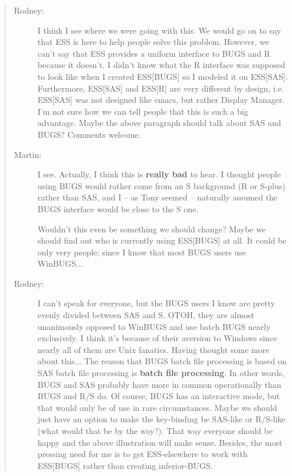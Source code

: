 \documentclass{article}
\newenvironment{Comment}{\begin{quote}\small\itshape }{\end{quote}}
\begin{document}
\begin{Comment}
\begin{description}
 \item[Rodney:]  I think I see where we were going with this.  We would go on to
say that ESS is here to help people solve this problem.  However,
we can't say that ESS provides a uniform interface to BUGS and R because
it doesn't.  I didn't know what the R interface was supposed to look like
when I created ESS[BUGS] so I modeled it on ESS[SAS].  Furthermore,
ESS[SAS] and ESS[R] are very different by design, i.e. ESS[SAS] was not
designed like emacs, but rather Display Manager.  I'm not sure how we can tell
people that this is such a big advantage.  Maybe the above paragraph
should talk about SAS and BUGS?  Comments welcome.

\item[Martin:] I see. Actually, I think this is \textbf{really bad} to hear.
  I thought people using BUGS would rather come from an S background
  (R or S-plus) rather than SAS, and I -- as Tony seemed -- naturally
  assumed the BUGS interface would be close to the S one.

  Wouldn't this even be something we should change?  Maybe we should find
  out who is currently using ESS[BUGS] at all. It could be only very
  people; since I know that most BUGS users use WinBUGS...

\item[Rodney:]  I can't speak for everyone, but the BUGS users I know are
pretty evenly divided between SAS and S.  OTOH, they are almost 
unanimously opposed to WinBUGS and use batch BUGS nearly exclusively.
I think it's because of their aversion to Windows since nearly all of
them are Unix fanatics.  
Having thought some more about this...  The reason that BUGS batch file
processing is based on SAS batch file processing is \textbf{batch file processing}.
In other words, BUGS and SAS probably have more in common operationally
than BUGS and R/S do.  Of course, BUGS has an interactive mode, but that
would only be of use in rare circumstances.  Maybe we should just have an 
option to make the key-binding be SAS-like or R/S-like (what would that be 
by the way?).  That way everyone should be happy and the above illustration
will make sense.  Besides, the most pressing need for me is to get 
ESS-elsewhere to work with ESS[BUGS] rather than creating inferior-BUGS.
\end{description}
\end{Comment}
\end{document}
